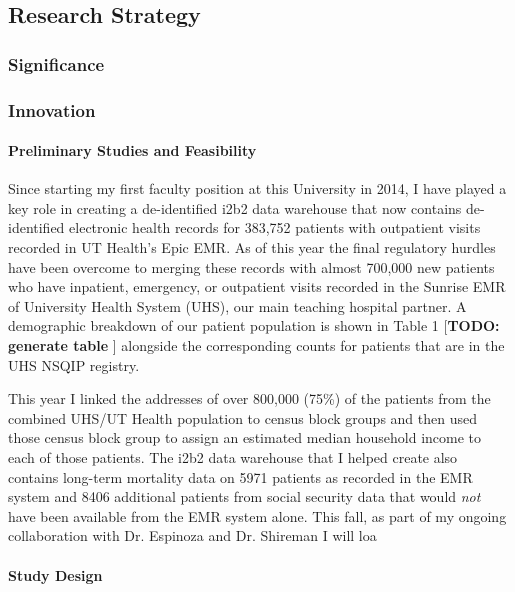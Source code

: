 \subsection{Research Strategy}\label{research-strategy}


\subsubsection{Significance}\label{significance}

\subsubsection{Innovation}\label{innovation}

\paragraph{Preliminary Studies and Feasibility}\label{preliminary-studies-and-feasibility} 
Since starting my first faculty position at this University in 2014, I have played a key role in creating a de-identified i2b2 data warehouse that now contains de-identified electronic health records for 383,752 patients with outpatient visits recorded in UT Health's Epic EMR. As of this year the final regulatory hurdles have been overcome to merging these records with almost 700,000 new patients who have inpatient, emergency, or outpatient visits recorded in the Sunrise EMR of University Health System (UHS), our main teaching hospital partner. A demographic breakdown of our patient population is shown in Table 1 [\textbf{TODO: generate table }] alongside the corresponding counts for patients that are in the UHS NSQIP registry.

This year I linked the addresses of over 800,000 (75\%) of the patients from the combined UHS/UT Health population to census block groups and then used those census block group to assign an estimated median household income to each of those patients. The i2b2 data warehouse that I helped create also contains long-term mortality data on 5971 patients as recorded in the EMR system and 8406 additional patients from social security data that would \textit{not} have been available from the EMR system alone. This fall, as part of my ongoing collaboration with Dr. Espinoza and Dr. Shireman I will loa


\paragraph{Study Design}\label{study-design}


